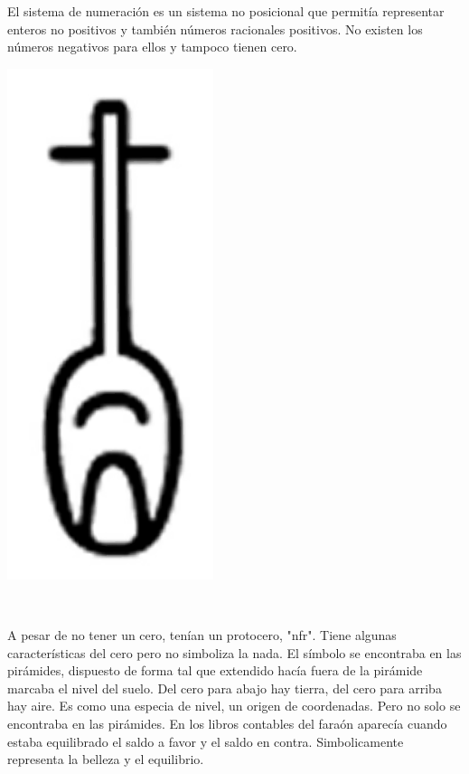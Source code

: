 El sistema de numeración es un sistema no posicional que permitía representar enteros no positivos y también números racionales positivos. No existen los números negativos para ellos y tampoco tienen cero. 
\\[0.5cm]
        \begin{minipage}{0.2\textwidth}
            \begin{flushleft} 
\includegraphics[scale=0.2]{20160804_080346.png}
            \end{flushleft}
        \end{minipage}
        ~
        \begin{minipage}{0.74\textwidth}

A pesar de no tener un cero, tenían un protocero, "nfr". Tiene algunas características del cero pero no simboliza la nada. El símbolo se encontraba en las pirámides, dispuesto de forma tal que extendido hacía fuera de la pirámide marcaba el nivel del suelo. Del cero para abajo hay tierra, del cero para arriba hay aire. Es como una especia de nivel, un origen de coordenadas. Pero no solo se encontraba en las pirámides. En los libros contables del faraón aparecía cuando estaba equilibrado el saldo a favor y el saldo en contra. Simbolicamente representa la belleza y el equilibrio.

        \end{minipage}\\[0.5cm]

